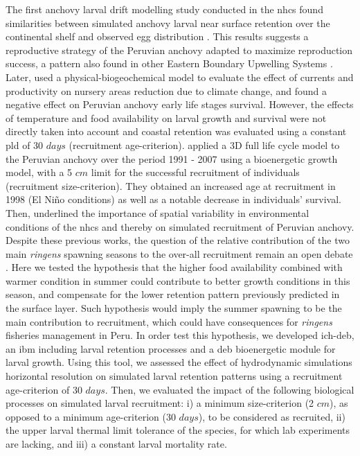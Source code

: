 The first anchovy larval drift modelling study conducted in the \acrshort{nhcs} found similarities between simulated anchovy larval near surface retention over the continental shelf and observed egg distribution \citep{BrocLett2008}. This results suggests a reproductive strategy of the Peruvian anchovy adapted to maximize reproduction success, a pattern also found in other Eastern Boundary Upwelling Systems \citep{BrocCola2009}. Later, \cite{BrocEche2013} used a physical-biogeochemical model to evaluate the effect of currents and productivity on nursery areas reduction due to climate change, and found a negative effect on Peruvian anchovy early life stages survival. However, the effects of temperature and food availability on larval growth and survival were not directly taken into account and coastal retention was evaluated using a constant \acrfull{pld} of 30 $days$ (recruitment age-criterion). \cite{XuChai2013} applied a 3D full life cycle model to the Peruvian anchovy over the period 1991 - 2007 using a bioenergetic growth model, with a 5 $cm$ limit for the successful recruitment of individuals (recruitment size-criterion). They obtained an increased age at recruitment in 1998 (El Ni\~{n}o conditions) as well as a notable decrease in individuals’ survival. Then, \cite{XuRose2015} underlined the importance of spatial variability in environmental conditions of the \acrshort{nhcs} and thereby on simulated recruitment of Peruvian anchovy.\\

Despite these previous works, the question of the relative contribution of the two main \textit{\gls{ringens}} spawning seasons to the over-all recruitment remain an open debate \citep{WalsWhit1980,PerePena2011}. Here we tested the hypothesis that the higher food availability combined with warmer condition in summer could contribute to better growth conditions in this season, and compensate for the lower retention pattern previously predicted in the surface layer. Such hypothesis would imply the summer spawning to be the main contribution to recruitment, which could have consequences for \textit{\gls{ringens}} fisheries management in Peru. In order test this hypothesis, we developed \gls{ich-deb}, an \acrfull{ibm} including larval retention processes \citep{LettVerl2008} and a \acrfull{deb} \citep{Kooi2009} bioenergetic module for larval growth. Using this tool, we assessed the effect of hydrodynamic simulations horizontal resolution on simulated larval retention patterns using a recruitment age-criterion of 30 $days$. Then, we evaluated the impact of the following biological processes on simulated larval recruitment: i) a minimum size-criterion (2 $cm$), as opposed to a minimum age-criterion (30 $days$), to be considered as recruited, ii) the upper larval thermal limit tolerance of the species, for which lab experiments are lacking, and iii) a constant larval mortality rate.


